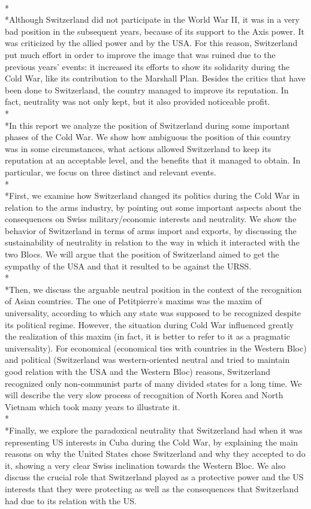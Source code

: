 \documentclass[a4paper]{article}
\begin{document}
\\*\\*Although Switzerland did not participate in the World War II, it was in a very bad position in the subsequent years, because of its support to the Axis power. It was criticized by the allied power and by the USA. For this reason, Switzerland put much effort in order to improve the image that was ruined due to the previous years' events: it increased its efforts to show its solidarity during the Cold War, like its contribution to the Marshall Plan. Besides the critics that have been done to Switzerland, the country managed to improve its reputation. In fact, neutrality was not only kept, but it also provided noticeable profit. 
\\*\\*In this report we analyze the position of Switzerland during some important phases of the Cold War. We show how ambiguous the position of this country was in some circumstances, what actions allowed Switzerland to keep its reputation at an acceptable level, and the benefits that it managed to obtain. In particular, we focus on three distinct and relevant events.
\\*\\*First, we examine how Switzerland changed its politics during the Cold War in relation to the arms industry, by pointing out some important aspects about the consequences on Swiss military/economic interests and neutrality. We show the behavior of Switzerland in terms of arms import and exports, by discussing the sustainability of neutrality in relation to the way in which it interacted with the two Blocs. We will argue that the position of Switzerland aimed to get the sympathy of the USA and that it resulted to be against the URSS.
\\*\\*Then, we discuss the arguable neutral position in the context of the recognition of Asian countries. The one of Petitpierre's maxims was the maxim of universality, according to which any state was supposed to be recognized despite its political regime. However, the situation during Cold War influenced greatly the realization of this maxim (in fact, it is better to refer to it as a pragmatic universality). For economical (economical ties with countries in the Western Bloc) and political (Switzerland was western-oriented neutral and tried to maintain good relation with the USA and the Western Bloc) reasons, Switzerland recognized only non-communist parts of many divided states for a long time. We will describe the very slow process of recognition of North Korea and North Vietnam which took many years to illustrate it.
\\*\\*Finally, we explore the paradoxical neutrality that Switzerland had when it was representing US interests in Cuba during the Cold War, by explaining the main reasons on why the United States chose Switzerland and why they accepted to do it, showing a very clear Swiss inclination towards the Western Bloc. We also discuss the crucial role that Switzerland played as a protective power and the US interests that they were protecting as well as the consequences that Switzerland had due to its relation with the US.
\clearpage
\end{document}
